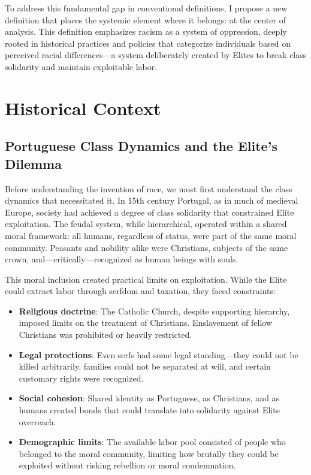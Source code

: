 \documentclass[12pt]{article}
\begin{document}
To address this fundamental gap in conventional definitions, I propose a new definition that places the systemic element where it belongs: at the center of analysis. This definition emphasizes racism as a system of oppression, deeply rooted in historical practices and policies that categorize individuals based on perceived racial differences---a system deliberately created by Elites to break class solidarity and maintain exploitable labor.

\section{Historical Context}

\subsection{Portuguese Class Dynamics and the Elite's Dilemma}

Before understanding the invention of race, we must first understand the class dynamics that necessitated it. In 15th century Portugal, as in much of medieval Europe, society had achieved a degree of class solidarity that constrained Elite exploitation. The feudal system, while hierarchical, operated within a shared moral framework: all humans, regardless of status, were part of the same moral community. Peasants and nobility alike were Christians, subjects of the same crown, and---critically---recognized as human beings with souls.

This moral inclusion created practical limits on exploitation. While the Elite could extract labor through serfdom and taxation, they faced constraints:
\begin{itemize}
    \item \textbf{Religious doctrine}: The Catholic Church, despite supporting hierarchy, imposed limits on the treatment of Christians. Enslavement of fellow Christians was prohibited or heavily restricted.
    \item \textbf{Legal protections}: Even serfs had some legal standing---they could not be killed arbitrarily, families could not be separated at will, and certain customary rights were recognized.
    \item \textbf{Social cohesion}: Shared identity as Portuguese, as Christians, and as humans created bonds that could translate into solidarity against Elite overreach.
    \item \textbf{Demographic limits}: The available labor pool consisted of people who belonged to the moral community, limiting how brutally they could be exploited without risking rebellion or moral condemnation.
\end{itemize}
\end{document}
